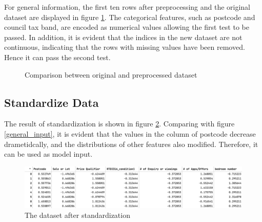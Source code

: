 \documentclass[12pt,twoside]{report}
\begin{document}
For general information, the first ten rows after preprocessing and the original dataset are displayed in figure \ref{general_info}. The categorical features, such as postcode and council tax band, are encoded as numerical values allowing the first test to be passed. In addition, it is evident that the indices in the new dataset are not continuous, indicating that the rows with missing values have been removed. Hence it can pass the second test. 

\begin{figure}[!htbp]
	\centering
	\caption{Comparison  between original and preprocessed dataset}
	\label{general_info}
\end{figure}

\subsection{Standardize Data}
The result of standardization is shown in figure \ref{preprocessed_dataset}. Comparing with figure \ref{general_input}, it is evident that the values in the column of postcode decrease drametidcally, and the distributions of other features also modified. Therefore, it can be used as model input.

\begin{figure}[!htbp]
	\centering
	\includegraphics[width=\linewidth]{normalized}
	\caption{The dataset after standardization}
	\label{preprocessed_dataset}
\end{figure}
\end{document}
